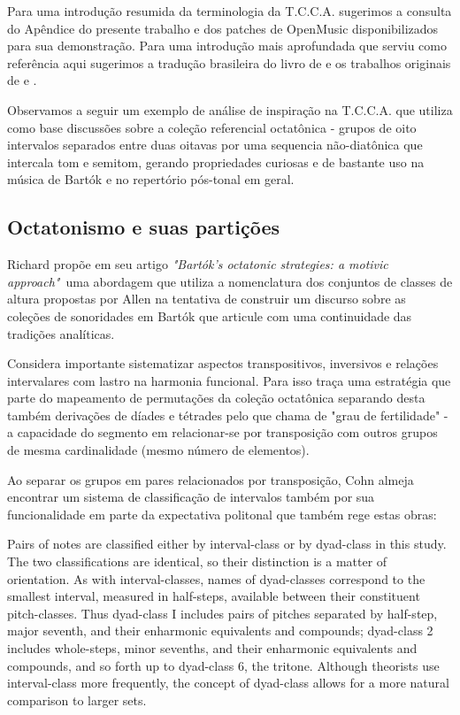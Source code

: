 \documentclass[
	12pt,				%
	openright,			%
	twoside,			%
	a4paper,			%
	english,			%
	french,				%
	spanish,			%
	brazil				%
	]{abntex2}
\begin{document}
Para uma introdução resumida da terminologia da T.C.C.A. sugerimos a consulta do Apêndice do presente trabalho e dos patches de OpenMusic disponibilizados para sua demonstração. Para uma introdução mais aprofundada que serviu como referência aqui sugerimos a tradução brasileira do livro de  e os trabalhos originais de  e .

Observamos a seguir um exemplo de análise de inspiração na T.C.C.A. que utiliza como base discussões sobre a coleção referencial octatônica - grupos de oito intervalos separados entre duas oitavas por uma sequencia não-diatônica que intercala tom e semitom, gerando propriedades curiosas e de bastante uso na música de Bartók e no repertório pós-tonal em geral.




\subsection{Octatonismo e suas partições}

Richard  propõe em seu artigo \textit{"Bartók's octatonic strategies: a motivic approach"}\ uma abordagem que utiliza a nomenclatura dos conjuntos de classes de altura propostas por Allen  na tentativa de construir um discurso sobre as coleções de sonoridades em Bartók que articule com uma continuidade das tradições analíticas.

Considera importante sistematizar aspectos transpositivos, inversivos e relações intervalares com lastro na harmonia funcional. Para isso traça uma estratégia que parte do mapeamento de permutações da coleção octatônica separando desta também derivações de díades e tétrades pelo que chama de "grau de fertilidade"\cite[ p.268]{cohn1991bartok} - a capacidade do segmento em relacionar-se por transposição com outros grupos de mesma cardinalidade (mesmo número de elementos).

Ao separar os grupos em pares relacionados por transposição, Cohn almeja encontrar um sistema de classificação de intervalos também por sua funcionalidade em parte da expectativa politonal que também rege estas obras:

\begin{citacao}
Pairs of notes are classified either by interval-class or by dyad-class in this study.
The two classifications are identical, so their distinction is a matter of orientation. As
with interval-classes, names of dyad-classes correspond to the smallest interval, measured in half-steps, available between their constituent pitch-classes. Thus dyad-class I includes pairs of pitches separated by half-step, major seventh, and their enharmonic equivalents and compounds; dyad-class 2 includes whole-steps, minor sevenths, and their enharmonic equivalents and compounds, and so forth up to
dyad-class 6, the tritone. Although theorists use interval-class more frequently, the
concept of dyad-class allows for a more natural comparison to larger sets.
\cite[ p.265-266]{cohn1991bartok}
\end{citacao}
\end{document}
